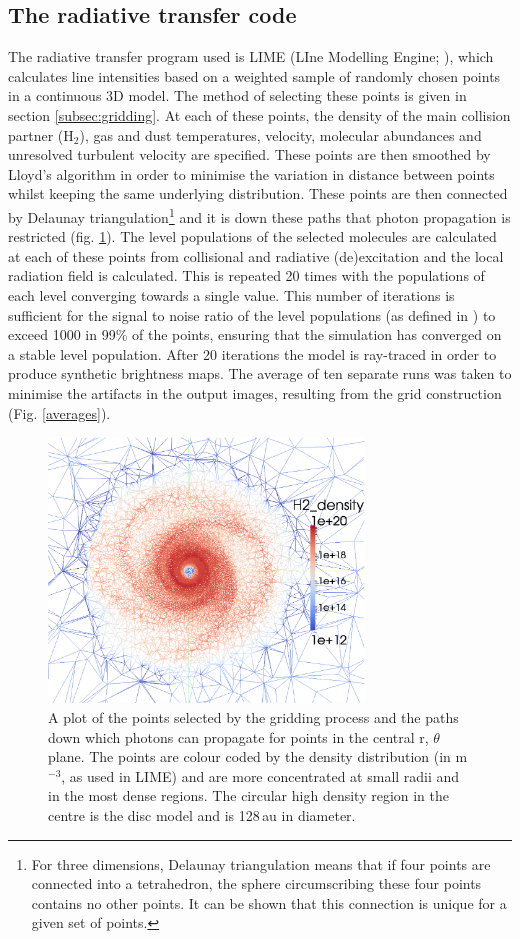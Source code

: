 \documentclass[useAMS,usenatbib]{mn2e}
\begin{document}
\subsection{The radiative transfer code} \label{subsec:radiative_transfer_code}
The radiative transfer program used is LIME (LIne Modelling Engine; \citealt{Brinch2010}), which  calculates line intensities based on a weighted sample of randomly chosen points in a continuous 3D model. The method of selecting these points is given in section \ref{subsec:gridding}. At each of these points, the density of the main collision partner (H$_2$), gas and dust temperatures, velocity, molecular abundances and unresolved turbulent velocity are specified. These points are then smoothed by Lloyd's algorithm \citep{Lloyd1982} in order to minimise the variation in distance between points whilst keeping the same underlying distribution. These points are then connected by Delaunay triangulation\footnote{For three dimensions, Delaunay triangulation means that if four points are connected into a tetrahedron, the sphere circumscribing these four points contains no other points. It can be shown that this connection is unique for a given set of points.} and it is down these paths that photon propagation is restricted (fig. \ref{grid}). The level populations of the selected molecules are calculated at each of these points from collisional and radiative (de)excitation and the local radiation field is calculated. This is repeated 20 times with the populations of each level converging towards a single value. This number of iterations is sufficient for the signal to noise ratio of the level populations (as defined in \citealt{Brinch2010}) to exceed 1000 in 99\% of the points, ensuring that the simulation has converged on a stable level population. After 20 iterations the model is ray-traced in order to produce synthetic brightness maps. The average of ten separate runs was taken to minimise the artifacts in the output images, resulting from the grid construction (Fig. \ref{averages}).


\begin{figure}
 \includegraphics[width=84mm]{Figures/model/lime3.eps}
 \caption{A plot of the points selected by the gridding process and the paths down which photons can propagate for points in the central r, $\theta$ plane. The points are colour coded by the density distribution (in m$^{-3}$, as used in LIME) and are more concentrated at small radii and in the most dense regions. The circular high density region in the centre is the disc model and is 128$\,$au in diameter.}
 \label{grid}
\end{figure}
\end{document}
